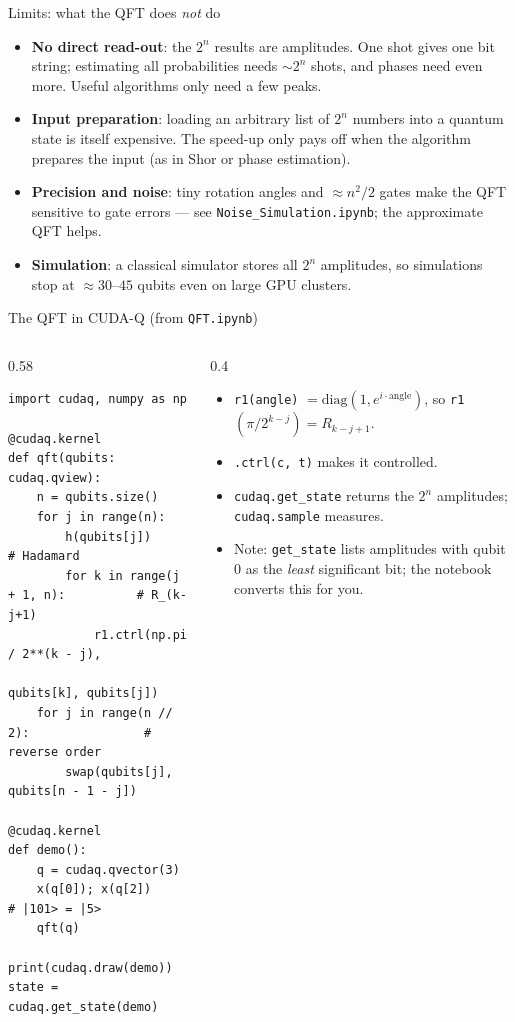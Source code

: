 \documentclass[aspectratio=169,11pt]{beamer}
\newcommand{\key}[1]{{\color{qdark}\textbf{#1}}}
\begin{document}
\begin{frame}{Limits: what the QFT does \emph{not} do}
  \begin{itemize}
    \item \key{No direct read-out}: the $2^n$ results are amplitudes. One shot gives one bit string; estimating all
      probabilities needs $\sim 2^n$ shots, and phases need even more. Useful algorithms only need a few peaks.
    \item \key{Input preparation}: loading an arbitrary list of $2^n$ numbers into a quantum state is itself expensive.
      The speed-up only pays off when the algorithm prepares the input (as in Shor or phase estimation).
    \item \key{Precision and noise}: tiny rotation angles and $\approx n^2/2$ gates make the QFT sensitive to gate errors
      --- see \texttt{Noise\_Simulation.ipynb}; the approximate QFT helps.
    \item \key{Simulation}: a classical simulator stores all $2^n$ amplitudes, so simulations stop at $\approx 30$--$45$
      qubits even on large GPU clusters.
  \end{itemize}
\end{frame}

\begin{frame}[fragile]{The QFT in CUDA-Q (from \texttt{QFT.ipynb})}
  \begin{columns}[T]
    \begin{column}{0.58\textwidth}
\begin{lstlisting}
import cudaq, numpy as np

@cudaq.kernel
def qft(qubits: cudaq.qview):
    n = qubits.size()
    for j in range(n):
        h(qubits[j])                       # Hadamard
        for k in range(j + 1, n):          # R_(k-j+1)
            r1.ctrl(np.pi / 2**(k - j),
                    qubits[k], qubits[j])
    for j in range(n // 2):                # reverse order
        swap(qubits[j], qubits[n - 1 - j])

@cudaq.kernel
def demo():
    q = cudaq.qvector(3)
    x(q[0]); x(q[2])                       # |101> = |5>
    qft(q)

print(cudaq.draw(demo))
state = cudaq.get_state(demo)
\end{lstlisting}
    \end{column}
    \begin{column}{0.4\textwidth}
      \begin{itemize}
        \item \texttt{r1(angle)} $= \mathrm{diag}(1, e^{i\cdot\text{angle}})$, so \texttt{r1}$(\pi/2^{k-j}) = R_{k-j+1}$.
        \item \texttt{.ctrl(c, t)} makes it controlled.
        \item \texttt{cudaq.get\_state} returns the $2^n$ amplitudes; \texttt{cudaq.sample} measures.
        \item Note: \texttt{get\_state} lists amplitudes with qubit 0 as the \emph{least} significant bit; the
          notebook converts this for you.
      \end{itemize}
    \end{column}
  \end{columns}
\end{frame}
\end{document}
